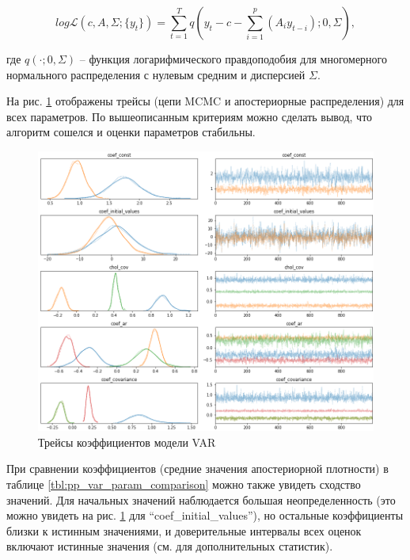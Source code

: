 \documentclass[a4paper,14pt]{extreport}
\begin{document}
\begin{equation}
	\mathit{log}\mathcal{L}(c, A, \Sigma; \{y_t\})
	=
	\sum\limits_{t=1}^{T}{
	q(y_t - c - \sum_{i=1}^{p}{(A_i y_{t-i})}; 0, \Sigma)
	} ,
	\label{eq:pp_var_loglike}
\end{equation}

\noindent
где $q(\cdot; 0, \Sigma)$ -- функция логарифмического правдоподобия для многомерного нормального распределения с нулевым средним и дисперсией $\Sigma$.

На рис. \ref{fig:pp_var_trace} отображены трейсы (цепи MCMC и апостериорные распределения) для всех параметров. По вышеописанным критериям \cite{stan_user_guide} можно сделать вывод, что алгоритм сошелся и оценки параметров стабильны.

\begin{figure}[H]
	\includegraphics[width=\linewidth]{img/gen/pp_var_trace.png}
	\caption{Трейсы коэффициентов модели VAR}
	\label{fig:pp_var_trace}
\end{figure}

При сравнении коэффициентов (средние значения апостериорной плотности) в таблице \ref{tbl:pp_var_param_comparison} можно также увидеть сходство значений. Для начальных значений наблюдается большая неопределенность (это можно увидеть на рис. \ref{fig:pp_var_trace} для ``coef\_initial\_values''), но остальные коэффициенты близки к истинным значениями, и доверительные интервалы всех оценок включают истинные значения (см.  для дополнительных статистик).
\end{document}
